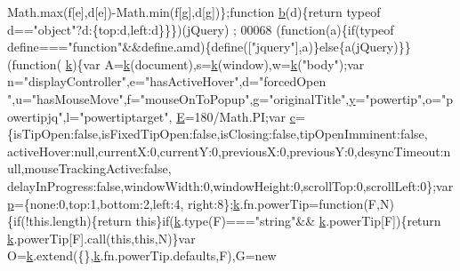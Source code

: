 \begin{DoxyCode}
{      Math.max(f[e],d[e])-Math.min(f[g],d[g])\};\textcolor{keyword}{function} \hyperlink{jquery_8js_aa4026ad5544b958e54ce5e106fa1c805}{b}(d)\{\textcolor{keywordflow}{return} typeof d==\textcolor{stringliteral}{"object"}?d:\{top:d,left:d\}\}\})(jQuery)
      ;
00068 (\textcolor{keyword}{function}(a)\{\textcolor{keywordflow}{if}(typeof define===\textcolor{stringliteral}{"function"}&&define.amd)\{define([\textcolor{stringliteral}{"jquery"}],a)\}\textcolor{keywordflow}{else}\{a(jQuery)\}\}(\textcolor{keyword}{function}(
      \hyperlink{jquery_8js_ab26645c014aa005ecedef329ecf58c99}{k})\{var A=\hyperlink{jquery_8js_ab26645c014aa005ecedef329ecf58c99}{k}(document),s=\hyperlink{jquery_8js_ab26645c014aa005ecedef329ecf58c99}{k}(window),w=\hyperlink{jquery_8js_ab26645c014aa005ecedef329ecf58c99}{k}(\textcolor{stringliteral}{"body"});var n=\textcolor{stringliteral}{"displayController"},e=\textcolor{stringliteral}{"hasActiveHover"},d=\textcolor{stringliteral}{"forcedOpen
      "},u=\textcolor{stringliteral}{"hasMouseMove"},f=\textcolor{stringliteral}{"mouseOnToPopup"},g=\textcolor{stringliteral}{"originalTitle"},\hyperlink{sensor_8h_a0ed6a908288e0cd87f79c1b5ab56d07c}{y}=\textcolor{stringliteral}{"powertip"},o=\textcolor{stringliteral}{"powertipjq"},l=\textcolor{stringliteral}{"powertiptarget"},
      \hyperlink{_l_c_d_8c_a07484107e6d9fdf38b53edf631d6511d}{E}=180/Math.PI;var \hyperlink{jquery_8js_ad171626e81625b5e9f5cb177a3a8fb1c}{c}=\{isTipOpen:\textcolor{keyword}{false},isFixedTipOpen:\textcolor{keyword}{false},isClosing:\textcolor{keyword}{false},tipOpenImminent:\textcolor{keyword}{false},
      activeHover:null,currentX:0,currentY:0,previousX:0,previousY:0,desyncTimeout:null,mouseTrackingActive:\textcolor{keyword}{false},
      delayInProgress:\textcolor{keyword}{false},windowWidth:0,windowHeight:0,scrollTop:0,scrollLeft:0\};var \hyperlink{jquery_8js_a2335e57f79b6acfb6de59c235dc8a83e}{p}=\{none:0,top:1,bottom:2,left:4,
      right:8\};\hyperlink{jquery_8js_ab26645c014aa005ecedef329ecf58c99}{k}.fn.powerTip=\textcolor{keyword}{function}(F,N)\{\textcolor{keywordflow}{if}(!this.length)\{\textcolor{keywordflow}{return} \textcolor{keyword}{this}\}\textcolor{keywordflow}{if}(\hyperlink{jquery_8js_ab26645c014aa005ecedef329ecf58c99}{k}.type(F)===\textcolor{stringliteral}{"string"}&&
      \hyperlink{jquery_8js_ab26645c014aa005ecedef329ecf58c99}{k}.powerTip[F])\{\textcolor{keywordflow}{return} \hyperlink{jquery_8js_ab26645c014aa005ecedef329ecf58c99}{k}.powerTip[F].call(\textcolor{keyword}{this},\textcolor{keyword}{this},N)\}var O=\hyperlink{jquery_8js_ab26645c014aa005ecedef329ecf58c99}{k}.extend(\{\},\hyperlink{jquery_8js_ab26645c014aa005ecedef329ecf58c99}{k}.fn.powerTip.defaults,F),G=\textcolor{keyword}{new}
}
\end{DoxyCode}
